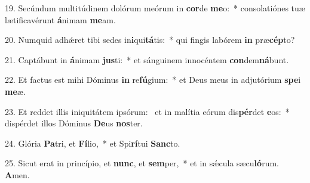 19. Secúndum multitúdinem dolórum meórum in \textbf{cor}de \textbf{me}o:~*  consolatiónes tuæ lætificavérunt \textbf{á}nimam \textbf{me}am.\

20. Numquid adhǽret tibi sedes in\textbf{i}qui\textbf{tá}tis:~*  qui fingis labórem \textbf{in} præ\textbf{cép}to?\

21. Captábunt in \textbf{á}nimam \textbf{jus}ti:~*  et sánguinem innocéntem \textbf{con}dem\textbf{ná}bunt.\

22. Et factus est mihi Dóminus \textbf{in} re\textbf{fú}gium:~*  et Deus meus in adjutórium \textbf{spe}i \textbf{me}æ.\

23. Et reddet illis iniquitátem ipsórum: \dag\  et in malítia eórum dis\textbf{pér}det \textbf{e}os:~*  dispérdet illos Dóminus \textbf{De}us \textbf{nos}ter.\

24. Glória \textbf{Pa}tri, et \textbf{Fí}lio,~*  et Spi\textbf{rí}tui \textbf{Sanc}to.\

25. Sicut erat in princípio, et \textbf{nunc}, et \textbf{sem}per,~*  et in sǽcula sæcu\textbf{ló}rum. \textbf{A}men.\

